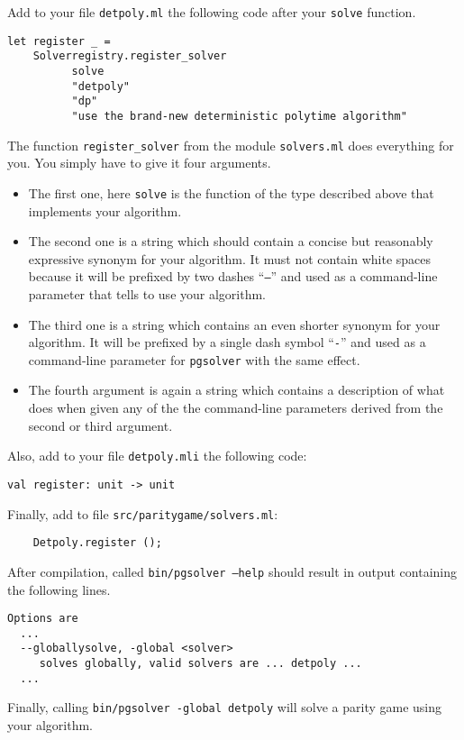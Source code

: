 Add to your file \texttt{detpoly.ml} the following code after your \texttt{solve} function.
\begin{verbatim}
let register _ =
    Solverregistry.register_solver
          solve
          "detpoly"
          "dp"
          "use the brand-new deterministic polytime algorithm"
\end{verbatim}

The function \texttt{register\_solver} from the module \texttt{solvers.ml} does everything for you. You
simply have to give it four arguments.
\begin{itemize}
\item The first one, here \texttt{solve} is the function of the type described above that implements
      your algorithm.
\item The second one is a string which should contain a concise but reasonably expressive synonym for your
      algorithm. It must not contain white spaces because it will be prefixed by two dashes ``\texttt{--}''
      and used as a command-line parameter that tells \pgsolver to use your algorithm.
\item The third one is a string which contains an even shorter synonym for your algorithm. It will be
      prefixed by a single dash symbol ``\texttt{-}'' and used as a command-line parameter for \texttt{pgsolver}
      with the same effect.
\item The fourth argument is again a string which contains a description of what \pgsolver does
      when given any of the the command-line parameters derived from the second or third argument.
\end{itemize}

Also, add to your file \texttt{detpoly.mli} the following code:
\begin{verbatim}
val register: unit -> unit
\end{verbatim}

Finally, add to file \texttt{src/paritygame/solvers.ml}:
\begin{verbatim}
    Detpoly.register ();
\end{verbatim}

After compilation, called \texttt{bin/pgsolver --help} should result in output containing the following
lines.
\begin{verbatim}
Options are
  ...
  --globallysolve, -global <solver>
     solves globally, valid solvers are ... detpoly ...
  ...
\end{verbatim}
Finally, calling \texttt{bin/pgsolver -global detpoly} will solve a parity game using your algorithm.



